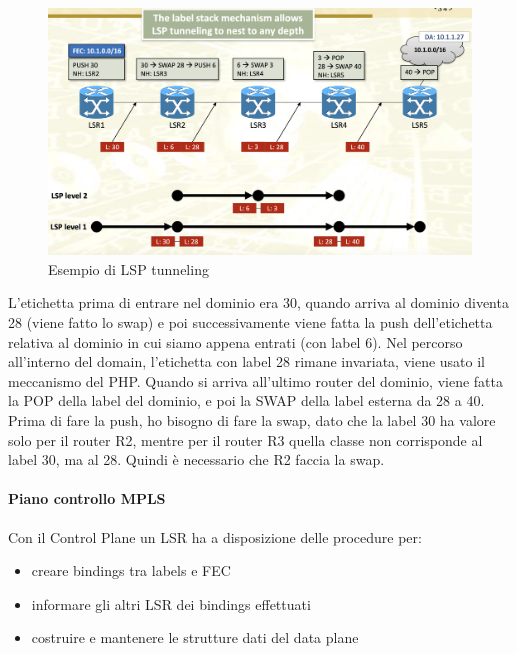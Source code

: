 \documentclass{article}
\begin{document}
\begin{figure}[H]
    \centering
    \includegraphics[scale=0.3]{figures/tunneling example mpls.png}
    \caption{Esempio di LSP tunneling}
\end{figure}
L'etichetta prima di entrare nel dominio era 30, quando arriva al dominio diventa 28 (viene fatto lo swap) e poi successivamente viene fatta la push dell'etichetta relativa al dominio in cui siamo appena entrati (con label 6). Nel percorso all'interno del domain, l'etichetta con label 28 rimane invariata, viene usato il meccanismo del PHP. Quando si arriva all'ultimo router del dominio, viene fatta la POP della label del dominio, e poi la SWAP della label esterna da 28 a 40. Prima di fare la push, ho bisogno di fare la swap, dato che la label 30 ha valore solo per il router R2, mentre per il router R3 quella classe non corrisponde al label 30, ma al 28. Quindi è necessario che R2 faccia la swap.

\paragraph{Piano controllo MPLS} Con il Control Plane un LSR ha a disposizione delle procedure per: 
\begin{itemize}
    \item creare bindings tra labels e FEC
    \item informare gli altri LSR dei bindings effettuati
    \item costruire e mantenere le strutture dati del data plane
\end{itemize}
\end{document}
